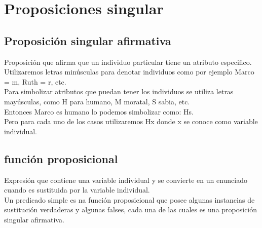 \documentclass[10pt]{book} 						%
\begin{document}
\section{Proposiciones singular}
\subsection{Proposición singular afirmativa}
Proposición que afirma que un individuo particular tiene un atributo especifico.\\
Utilizaremos letras minúsculas para denotar individuos como por ejemplo Marco = m, Ruth = r, etc.\\
Para simbolizar atributos que puedan tener los individuos se utiliza letras mayúsculas, como H para humano, M moratal, S sabia, etc.\\
Entonces Marco es humano lo podemos simbolizar como: Hs.\\
Pero para cada uno de los casos utilizaremos Hx donde x se conoce como variable individual.
\subsection{función proposicional}
Expresión que contiene una variable individual y se convierte en un enunciado cuando es sustituida por la variable individual.\\
Un predicado simple es na función proposicional que posee algunas instancias de sustitución verdaderas y algunas falses, cada una de las cuales es una proposición singular afirmativa.
\end{document}
